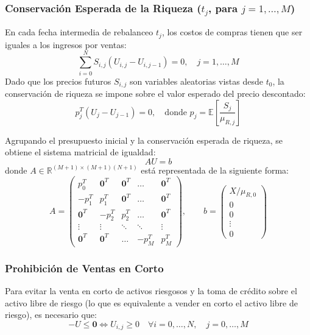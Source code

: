 \documentclass[11pt,a4paper]{article}
\begin{document}
\subsubsection{Conservación Esperada de la Riqueza \texorpdfstring{($t_j$, para $j = 1, \dots, M$)}{(tj, j = 1...M)}}
En cada fecha intermedia de rebalanceo $t_j$, los costos de compras tienen que ser iguales a los ingresos por ventas:
\begin{equation}
    \sum_{i=0}^N S_{i,j} (U_{i,j} - U_{i,j-1}) = 0, \quad j = 1, \dots, M
\end{equation}
Dado que los precios futuros $S_{i,j}$ son variables aleatorias vistas desde $t_0$, la conservación de riqueza se impone sobre el valor esperado del precio descontado:
\begin{equation}
    p_j^T (U_j - U_{j-1}) = 0, \quad \text{donde } p_j = \mathbb{E}\left[ \frac{S_j}{\mu_{R,j}} \right]
\end{equation}

Agrupando el presupuesto inicial y la conservación esperada de riqueza, se obtiene el sistema matricial de igualdad:
\begin{equation}
    AU = b
\end{equation}
donde $A \in \mathbb{R}^{(M+1)\times (M+1)(N+1)}$ está representada de la siguiente forma:
\begin{equation}
A = \begin{pmatrix}
p_0^T & \mathbf{0}^T & \mathbf{0}^T & \dots & \mathbf{0}^T \\
-p_1^T & p_1^T & \mathbf{0}^T & \dots & \mathbf{0}^T \\
\mathbf{0}^T & -p_2^T & p_2^T & \dots & \mathbf{0}^T \\
\vdots & \vdots & \ddots & \ddots & \vdots \\
\mathbf{0}^T & \mathbf{0}^T & \dots & -p_M^T & p_M^T
\end{pmatrix}, \qquad
b = \begin{pmatrix} X / \mu_{R,0} \\ 0 \\ 0 \\ \vdots \\ 0 \end{pmatrix}
\end{equation}

\subsubsection{Prohibición de Ventas en Corto}
Para evitar la venta en corto de activos riesgosos y la toma de crédito sobre el activo libre de riesgo (lo que es equivalente a vender en corto el activo libre de riesgo), es necesario que:
\begin{equation}
    -U \le \mathbf{0} \iff U_{i,j} \ge 0 \quad \forall i = 0, \dots, N, \quad j = 0, \dots, M
\end{equation}
\end{document}
